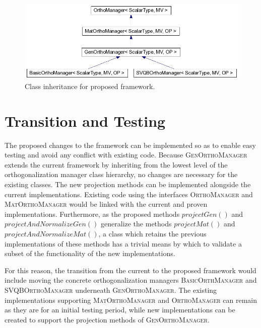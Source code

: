 \documentclass[12pt,letterpaper]{SANDreport}
\theoremstyle{example}
\begin{document}
\begin{figure}[ht]
\begin{center}
\includegraphics[width=6.0in]{newhier.png}
\end{center}
\caption{Class inheritance for proposed framework.}
\label{fig:newhier}
\end{figure}



\section{Transition and Testing}

The proposed changes to the framework can be implemented so as to enable easy testing and
avoid any conflict with existing code. Because \textsc{GenOrthoManager} extends the
current framework by inheriting from the lowest level of the orthogonalization manager
class hierarchy, no changes are necessary for the existing classes. The new projection
methods can be implemented alongside the current implementations. Existing code using the
interfaces \textsc{OrthoManager} and \textsc{MatOrthoManager} would be linked with the
current and proven implementations. Furthermore, as the proposed methods
$projectGen()$ and $projectAndNormalizeGen()$ generalize the methods $projectMat()$ and
$projectAndNormalizeMat()$, a class which retains the previous implementations of these
methods has a trivial means by which to validate a subset of the functionality of
the new implementations.

For this reason, the transition from the current to the proposed framework would include
moving the concrete orthogonalization managers \textsc{BasicOrthManager} and
\textsc{SVQBOrthoManager} underneath \textsc{GenOrthoManager}. The existing
implementations supporting \textsc{MatOrthoManager} and \textsc{OrthoManager} can remain
as they are for an initial testing period, while new implementations can be created to
support the projection methods of \textsc{GenOrthoManager}.
\end{document}
